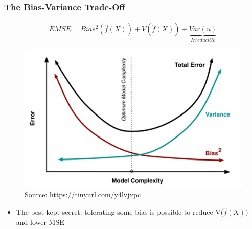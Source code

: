 \documentclass[
  shownotes,
  xcolor={svgnames},
  hyperref={colorlinks,citecolor=DarkBlue,linkcolor=andesred,urlcolor=DarkBlue}
  , aspectratio=169]{beamer}
\begin{document}

\begin{frame}
\frametitle{The Bias-Variance Trade-Off}

\begin{align}
  EMSE = Bias^2 (\hat f(X))+V (\hat f(X)) +\underset{Irreducible}{\underbrace{Var(u)}}
\end{align}



\begin{figure}[H] \centering
  \centering
  \includegraphics[scale=0.35]{figures/medium_bias_variance_trade_off.png}
  \\
  \tiny
  Source: https://tinyurl.com/y4lvjxpc
\end{figure}
\begin{itemize}
  
  \item The best kept secret: tolerating some bias is possible to reduce V($\hat f(X)$) and lower MSE
  
\end{itemize}
\end{frame}




\end{document}
